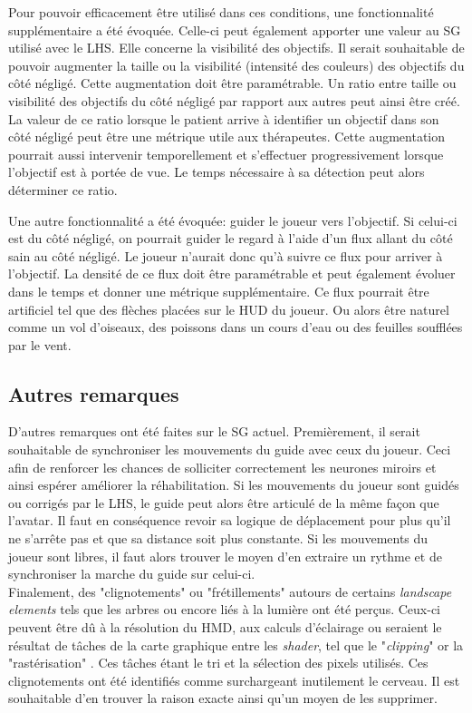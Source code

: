 		Pour pouvoir efficacement être utilisé dans ces conditions, une fonctionnalité supplémentaire a été évoquée. Celle-ci peut également apporter une valeur au SG utilisé avec le LHS. Elle concerne la visibilité des objectifs. Il serait souhaitable de pouvoir augmenter la taille ou la visibilité (intensité des couleurs) des objectifs du côté négligé. Cette augmentation doit être paramétrable. Un ratio entre taille ou visibilité des objectifs du côté négligé par rapport aux autres peut ainsi être créé. La valeur de ce ratio lorsque le patient arrive à identifier un objectif dans son côté négligé peut être une métrique utile aux thérapeutes. Cette augmentation pourrait aussi intervenir temporellement et s'effectuer progressivement lorsque l'objectif est à portée de vue. Le temps nécessaire à sa détection peut alors déterminer ce ratio. 
		
		Une autre fonctionnalité a été évoquée: guider le joueur vers l'objectif. Si celui-ci est du côté négligé, on pourrait guider le regard à l'aide d'un flux allant du côté sain au côté négligé. Le joueur n'aurait donc qu'à suivre ce flux pour arriver à l'objectif. La densité de ce flux doit être paramétrable et peut également évoluer dans le temps et donner une métrique supplémentaire. Ce flux pourrait être artificiel tel que des flèches placées sur le HUD du joueur. Ou alors être naturel comme un vol d'oiseaux, des poissons dans un cours d'eau ou des feuilles soufflées par le vent.
	
	\subsection*{Autres remarques}
		D'autres remarques ont été faites sur le SG actuel. Premièrement, il serait souhaitable de synchroniser les mouvements du guide avec ceux du joueur. Ceci afin de renforcer les chances de solliciter correctement les neurones miroirs et ainsi espérer améliorer la réhabilitation. Si les mouvements du joueur sont guidés ou corrigés par le LHS, le guide peut alors être articulé de la même façon que l'avatar. Il faut en conséquence revoir sa logique de déplacement pour plus qu'il ne s'arrête pas et que sa distance soit plus constante. Si les mouvements du joueur sont libres, il faut alors trouver le moyen d'en extraire un rythme et de synchroniser la marche du guide sur celui-ci.
		\\
		
		Finalement, des "clignotements" ou "frétillements" autours de certains \textit{landscape elements} tels que les arbres ou encore liés à la lumière ont été perçus. Ceux-ci peuvent être dû à la résolution du HMD, aux calculs d'éclairage ou seraient le résultat de tâches de la carte graphique entre les \textit{shader}, tel que le "\textit{clipping}" or la "rastérisation" \cite{Gobron_WebGL}. Ces tâches étant le tri et la sélection des pixels utilisés.
		Ces clignotements ont été identifiés comme surchargeant inutilement le cerveau. Il est souhaitable d'en trouver la raison exacte ainsi qu'un moyen de les supprimer.
		
		
	
	
	
	
	